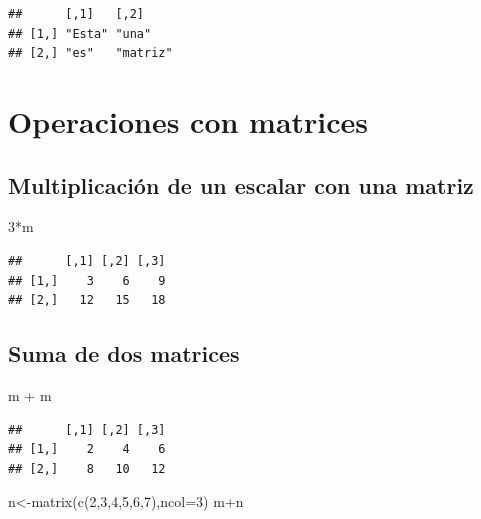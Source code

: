 \documentclass[
]{book}
\newenvironment{Shaded}{\begin{snugshade}}{\end{snugshade}}
\newcommand{\AttributeTok}[1]{\textcolor[rgb]{0.77,0.63,0.00}{#1}}
\newcommand{\DecValTok}[1]{\textcolor[rgb]{0.00,0.00,0.81}{#1}}
\newcommand{\FunctionTok}[1]{\textcolor[rgb]{0.00,0.00,0.00}{#1}}
\newcommand{\NormalTok}[1]{#1}
\newcommand{\OtherTok}[1]{\textcolor[rgb]{0.56,0.35,0.01}{#1}}
\newcommand{\SpecialCharTok}[1]{\textcolor[rgb]{0.00,0.00,0.00}{#1}}
\begin{document}
\begin{verbatim}
##      [,1]   [,2]    
## [1,] "Esta" "una"   
## [2,] "es"   "matriz"
\end{verbatim}

\hypertarget{operaciones-con-matrices}{%
\section{Operaciones con matrices}\label{operaciones-con-matrices}}

\hypertarget{multiplicaciuxf3n-de-un-escalar-con-una-matriz}{%
\subsection{Multiplicación de un escalar con una matriz}\label{multiplicaciuxf3n-de-un-escalar-con-una-matriz}}

\begin{Shaded}
\begin{Highlighting}[]
\DecValTok{3}\SpecialCharTok{*}\NormalTok{m}
\end{Highlighting}
\end{Shaded}

\begin{verbatim}
##      [,1] [,2] [,3]
## [1,]    3    6    9
## [2,]   12   15   18
\end{verbatim}

\hypertarget{suma-de-dos-matrices}{%
\subsection{Suma de dos matrices}\label{suma-de-dos-matrices}}

\begin{Shaded}
\begin{Highlighting}[]
\NormalTok{m }\SpecialCharTok{+}\NormalTok{ m}
\end{Highlighting}
\end{Shaded}

\begin{verbatim}
##      [,1] [,2] [,3]
## [1,]    2    4    6
## [2,]    8   10   12
\end{verbatim}

\begin{Shaded}
\begin{Highlighting}[]
\NormalTok{n}\OtherTok{\textless{}{-}}\FunctionTok{matrix}\NormalTok{(}\FunctionTok{c}\NormalTok{(}\DecValTok{2}\NormalTok{,}\DecValTok{3}\NormalTok{,}\DecValTok{4}\NormalTok{,}\DecValTok{5}\NormalTok{,}\DecValTok{6}\NormalTok{,}\DecValTok{7}\NormalTok{),}\AttributeTok{ncol=}\DecValTok{3}\NormalTok{)}
\NormalTok{m}\SpecialCharTok{+}\NormalTok{n}
\end{Highlighting}
\end{Shaded}
\end{document}
